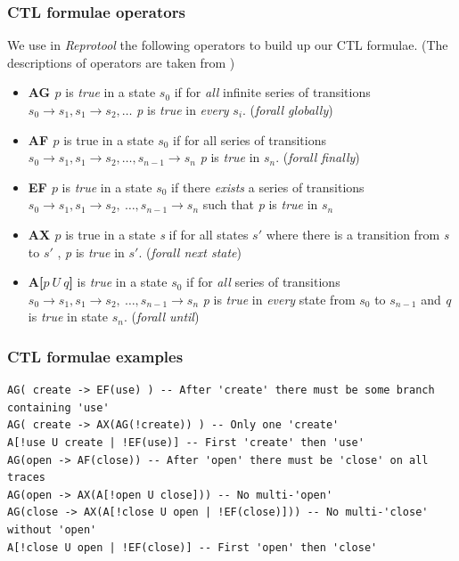 \subsubsection{CTL formulae operators}
We use in \emph{Reprotool} the following operators to build up our \ac{CTL} formulae. (The descriptions of operators are taken from
\cite{nusmv-manual}) 

\begin{itemize}
 \item \textbf{AG $p$} is \emph{true} in a state $s_{0}$ if for \emph{all} infinite series of transitions $s_{0} \rightarrow s_{1} , s_{1} \rightarrow 
  s_{2} , \ldots$ \emph{p} is \emph{true} in \emph{every} $s_{i}$. (\emph{forall globally})
 
 \item \textbf{AF $p$} is true in a state $s_{0}$ if for all series of transitions $s_{0} \rightarrow s_{1}, s_{1} \rightarrow
  s_{2},\ldots, s_{n-1} \rightarrow s_{n}$ \emph{p} is \emph{true} in $s_{n}$. (\emph{forall finally})

 \item \textbf{EF $p$} is \emph{true} in a state $s_{0}$ if there \emph{exists} a series of transitions $s_{0} \rightarrow s_{1}, 
 s_{1} \rightarrow s_{2},~\ldots, s_{n-1} \rightarrow s_{n}$ such that \emph{p} is \emph{true} in $s_{n}$
  
\item \textbf{AX $p$} is true in a state \emph{s} if for all states $s'$ where there is a transition from \emph{s} to
  $s'$ , \emph{p} is \emph{true} in $s'$. (\emph{forall next state})
  \item \textbf{A[$p~U~q$]} is \emph{true} in a state $s_{0}$ if for \emph{all} series of transitions $s_{0} \rightarrow s_{1},
  s_{1} \rightarrow s_{2},~\ldots, s_{n-1} \rightarrow s_{n}$ \emph{p} is \emph{true} in \emph{every} state from $s_{0}$ to
  $s_{n-1}$ and \emph{q} is \emph{true} in state $s_{n}$. (\emph{forall until})
\end{itemize}

\subsubsection{CTL formulae examples}
\begin{lstlisting}[language=NuSMVLang]
AG( create -> EF(use) ) -- After 'create' there must be some branch containing 'use'
AG( create -> AX(AG(!create)) ) -- Only one 'create'
A[!use U create | !EF(use)] -- First 'create' then 'use'
AG(open -> AF(close)) -- After 'open' there must be 'close' on all traces
AG(open -> AX(A[!open U close])) -- No multi-'open'
AG(close -> AX(A[!close U open | !EF(close)])) -- No multi-'close' without 'open'
A[!close U open | !EF(close)] -- First 'open' then 'close'
\end{lstlisting}


